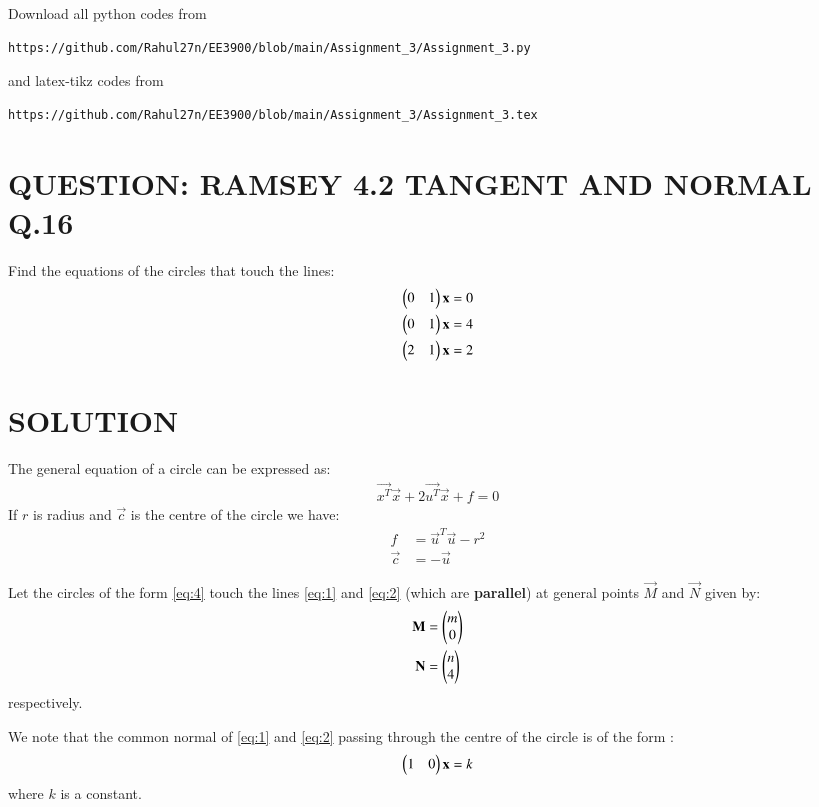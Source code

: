 \documentclass[journal,12pt,twocolumn]{IEEEtran}
\begin{document}
\maketitle
\newpage
\bigskip
\renewcommand{\thefigure}{\theenumi}
\renewcommand{\thetable}{\theenumi}
Download all python codes from 
\begin{lstlisting}
https://github.com/Rahul27n/EE3900/blob/main/Assignment_3/Assignment_3.py
\end{lstlisting}
%
and latex-tikz codes from 
%
\begin{lstlisting}
https://github.com/Rahul27n/EE3900/blob/main/Assignment_3/Assignment_3.tex
\end{lstlisting}
\vspace{0.5cm}
\section{QUESTION: RAMSEY 4.2 TANGENT AND NORMAL Q.16}
Find the equations of the circles that touch the lines:
\begin{align}
\begin{pmatrix}0 & 1\end{pmatrix}\mathbf{x} &= 0 \label{eq:1}
\\\begin{pmatrix}0 & 1\end{pmatrix}\mathbf{x} &= 4 \label{eq:2}
\\\begin{pmatrix}2 & 1\end{pmatrix}\mathbf{x} &= 2 \label{eq:3}
\end{align}
\section{SOLUTION}
The general equation of a circle can be expressed as:
\begin{align}
\vec{x^T}\vec{x} + 2\vec{u^T}\vec{x} + f = 0 \label{eq:4}
\end{align}
If $r$ is radius and $\vec{c}$ is the centre of the circle we have:
\begin{align}
f &=\vec{u}^T\vec{u}-r^2  \label{eq:5} \\  
\vec{c} &=-\vec{u}
\end{align}

Let the circles of the form \eqref{eq:4} touch the lines \eqref{eq:1} and \eqref{eq:2} (which are \textbf{parallel}) at general points $\vec{M}$ and $\vec{N}$ given by:
\begin{align}
\mathbf{M} &= \begin{pmatrix}m \\ 0\end{pmatrix}\\
\mathbf{N} &= \begin{pmatrix}n \\ 4\end{pmatrix}
\end{align} 
respectively.

We note that the common normal of \eqref{eq:1} and \eqref{eq:2} passing through the centre of the circle is of the form :
\begin{align}
\begin{pmatrix}1 & 0\end{pmatrix}\mathbf{x}=k 
\end{align}
where $k$ is a constant.
\end{document}
